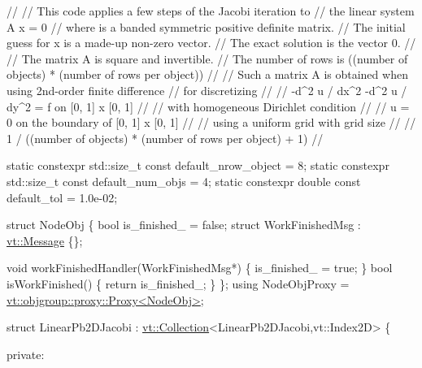 \begin{DoxyCodeInclude}

\textcolor{comment}{//}
\textcolor{comment}{// This code applies a few steps of the Jacobi iteration to}
\textcolor{comment}{// the linear system  A x = 0}
\textcolor{comment}{// where is a banded symmetric positive definite matrix.}
\textcolor{comment}{// The initial guess for x is a made-up non-zero vector.}
\textcolor{comment}{// The exact solution is the vector 0.}
\textcolor{comment}{//}
\textcolor{comment}{// The matrix A is square and invertible.}
\textcolor{comment}{// The number of rows is ((number of objects) * (number of rows per object))}
\textcolor{comment}{//}
\textcolor{comment}{// Such a matrix A is obtained when using 2nd-order finite difference}
\textcolor{comment}{// for discretizing}
\textcolor{comment}{//}
\textcolor{comment}{// -d^2 u / dx^2 -d^2 u / dy^2 = f   on  [0, 1] x [0, 1]}
\textcolor{comment}{//}
\textcolor{comment}{// with homogeneous Dirichlet condition}
\textcolor{comment}{//}
\textcolor{comment}{// u = 0 on the boundary of [0, 1] x [0, 1]}
\textcolor{comment}{//}
\textcolor{comment}{// using a uniform grid with grid size}
\textcolor{comment}{//}
\textcolor{comment}{// 1 / ((number of objects) * (number of rows per object) + 1)}
\textcolor{comment}{//}


\textcolor{keyword}{static} constexpr std::size\_t \textcolor{keyword}{const} default\_nrow\_object = 8;
\textcolor{keyword}{static} constexpr std::size\_t \textcolor{keyword}{const} default\_num\_objs = 4;
\textcolor{keyword}{static} constexpr \textcolor{keywordtype}{double} \textcolor{keyword}{const} default\_tol = 1.0e-02;

\textcolor{keyword}{struct }NodeObj \{
  \textcolor{keywordtype}{bool} is\_finished\_ = \textcolor{keyword}{false};
  \textcolor{keyword}{struct }WorkFinishedMsg : \hyperlink{structvt_1_1messaging_1_1_active_msg}{vt::Message} \{\};

  \textcolor{keywordtype}{void} workFinishedHandler(WorkFinishedMsg*) \{ is\_finished\_ = \textcolor{keyword}{true}; \}
  \textcolor{keywordtype}{bool} isWorkFinished() \{ \textcolor{keywordflow}{return} is\_finished\_; \}
\};
\textcolor{keyword}{using} NodeObjProxy = \hyperlink{structvt_1_1objgroup_1_1proxy_1_1_proxy}{vt::objgroup::proxy::Proxy<NodeObj>};

\textcolor{keyword}{struct }LinearPb2DJacobi : \hyperlink{structvt_1_1vrt_1_1collection_1_1_collection}{vt::Collection}<LinearPb2DJacobi,vt::Index2D> \{

\textcolor{keyword}{private}:


\end{DoxyCodeInclude}
